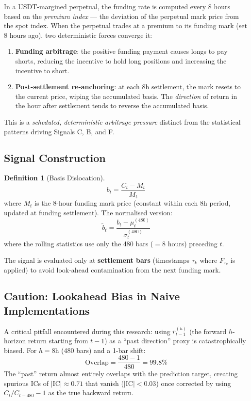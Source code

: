\documentclass[12pt, a4paper]{article}
\theoremstyle{definition}
\newtheorem{definition}{Definition}[section]
\newcommand{\IC}{\mathrm{IC}}
\begin{document}
In a USDT-margined perpetual, the funding rate is computed every 8 hours
based on the \emph{premium index} — the deviation of the perpetual mark price
from the spot index. When the perpetual trades at a premium to its funding
mark (set 8 hours ago), two deterministic forces converge it:
\begin{enumerate}
  \item \textbf{Funding arbitrage}: the positive funding payment causes
        longs to pay shorts, reducing the incentive to hold long positions
        and increasing the incentive to short.
  \item \textbf{Post-settlement re-anchoring}: at each 8h settlement, the
        mark resets to the current price, wiping the accumulated basis.
        The \emph{direction} of return in the hour after settlement tends
        to reverse the accumulated basis.
\end{enumerate}

This is a \emph{scheduled, deterministic arbitrage pressure} distinct from
the statistical patterns driving Signals C, B, and F.

\subsection{Signal Construction}

\begin{definition}[Basis Dislocation]
  \[
    b_t = \frac{C_t - M_t}{M_t}
  \]
  where $M_t$ is the 8-hour funding mark price (constant within each 8h period,
  updated at funding settlement). The normalised version:
  \[
    \tilde{b}_t = \frac{b_t - \mu_t^{(480)}}{\sigma_t^{(480)}}
  \]
  where the rolling statistics use only the 480 bars ($= 8$ hours) preceding $t$.
\end{definition}

The signal is evaluated only at \textbf{settlement bars} (timestamps
$\tau_k$ where $F_{\tau_k}$ is applied) to avoid look-ahead contamination
from the next funding mark.

\subsection{Caution: Lookahead Bias in Naive Implementations}

A critical pitfall encountered during this research: using
$r_{t-1}^{(h)}$ (the forward $h$-horizon return starting from $t-1$) as a
``past direction'' proxy is catastrophically biased. For $h = 8\text{h}$
(480 bars) and a 1-bar shift:
\[
  \text{Overlap} = \frac{480 - 1}{480} = 99.8\%
\]
The ``past'' return almost entirely overlaps with the prediction target,
creating spurious ICs of $|\IC| \approx 0.71$ that vanish ($|\IC| < 0.03$)
once corrected by using $C_t / C_{t-480} - 1$ as the true backward return.
\end{document}
